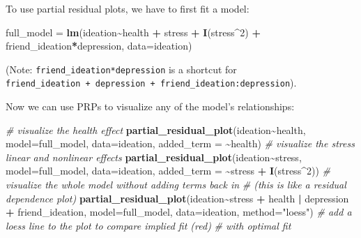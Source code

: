 \documentclass[
  man,floatsintext]{apa6}
\newenvironment{Shaded}{\begin{snugshade}}{\end{snugshade}}
\newcommand{\AttributeTok}[1]{\textcolor[rgb]{0.13,0.29,0.53}{#1}}
\newcommand{\CommentTok}[1]{\textcolor[rgb]{0.56,0.35,0.01}{\textit{#1}}}
\newcommand{\DecValTok}[1]{\textcolor[rgb]{0.00,0.00,0.81}{#1}}
\newcommand{\FunctionTok}[1]{\textcolor[rgb]{0.13,0.29,0.53}{\textbf{#1}}}
\newcommand{\NormalTok}[1]{#1}
\newcommand{\OtherTok}[1]{\textcolor[rgb]{0.56,0.35,0.01}{#1}}
\newcommand{\SpecialCharTok}[1]{\textcolor[rgb]{0.81,0.36,0.00}{\textbf{#1}}}
\newcommand{\StringTok}[1]{\textcolor[rgb]{0.31,0.60,0.02}{#1}}
\begin{document}
To use partial residual plots, we have to first fit a model:

\begin{Shaded}
\begin{Highlighting}[]
\NormalTok{full\_model }\OtherTok{=} \FunctionTok{lm}\NormalTok{(ideation}\SpecialCharTok{\textasciitilde{}}\NormalTok{health }\SpecialCharTok{+} 
\NormalTok{                  stress }\SpecialCharTok{+} \FunctionTok{I}\NormalTok{(stress}\SpecialCharTok{\^{}}\DecValTok{2}\NormalTok{) }\SpecialCharTok{+}
\NormalTok{                  friend\_ideation}\SpecialCharTok{*}\NormalTok{depression, }
                \AttributeTok{data=}\NormalTok{ideation)}
\end{Highlighting}
\end{Shaded}

(Note: \texttt{friend\_ideation*depression} is a shortcut for \texttt{friend\_ideation\ +\ depression\ +\ friend\_ideation:depression}).

Now we can use PRPs to visualize any of the model's relationships:

\begin{Shaded}
\begin{Highlighting}[]
\CommentTok{\# visualize the health effect}
\FunctionTok{partial\_residual\_plot}\NormalTok{(ideation}\SpecialCharTok{\textasciitilde{}}\NormalTok{health, }
                           \AttributeTok{model=}\NormalTok{full\_model,}
                           \AttributeTok{data=}\NormalTok{ideation, }
                           \AttributeTok{added\_term =} \SpecialCharTok{\textasciitilde{}}\NormalTok{health)}
\CommentTok{\# visualize the stress linear and nonlinear effects}
\FunctionTok{partial\_residual\_plot}\NormalTok{(ideation}\SpecialCharTok{\textasciitilde{}}\NormalTok{stress, }
                           \AttributeTok{model=}\NormalTok{full\_model,}
                           \AttributeTok{data=}\NormalTok{ideation, }
                           \AttributeTok{added\_term =} \SpecialCharTok{\textasciitilde{}}\NormalTok{stress }\SpecialCharTok{+} \FunctionTok{I}\NormalTok{(stress}\SpecialCharTok{\^{}}\DecValTok{2}\NormalTok{))}
\CommentTok{\# visualize the whole model without adding terms back in}
\CommentTok{\# (this is like a residual dependence plot)}
\FunctionTok{partial\_residual\_plot}\NormalTok{(ideation}\SpecialCharTok{\textasciitilde{}}\NormalTok{stress }\SpecialCharTok{+}\NormalTok{ health }\SpecialCharTok{|} 
\NormalTok{                        depression }\SpecialCharTok{+}\NormalTok{ friend\_ideation, }
                           \AttributeTok{model=}\NormalTok{full\_model,}
                           \AttributeTok{data=}\NormalTok{ideation, }
                           \AttributeTok{method=}\StringTok{"loess"}\NormalTok{)}
    \CommentTok{\# add a loess line to the plot to compare implied fit (red) }
    \CommentTok{\# with optimal fit}
\end{Highlighting}
\end{Shaded}
\end{document}
